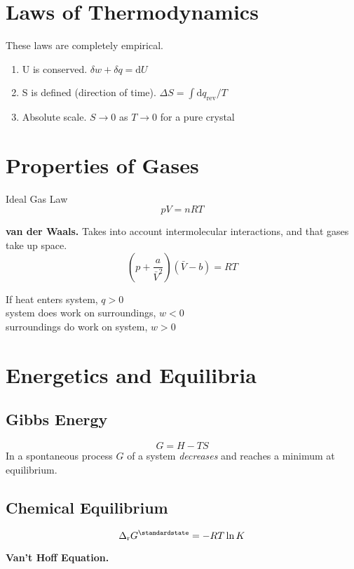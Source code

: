 \section{Laws of Thermodynamics}
These laws are completely empirical.

\begin{enumerate}
    \item U is conserved. $\delta w + \delta q = \mathrm{d}U$
    \item S is defined (direction of time). $ \Delta S = \int \mathrm{d}q_{\mathrm{rev}} / T$
    \item Absolute scale. $S \rightarrow 0$ as $T \rightarrow 0$ for a pure crystal
\end{enumerate}

\section{Properties of Gases}
Ideal Gas Law $$pV = nRT$$

\textbf{van der Waals.} Takes into account intermolecular interactions, and that gases take up space.
$$\left(p + \frac{a}{\bar{V}^2}\right) \left(\bar{V} - b\right) = RT$$ 

If heat enters system, $q > 0$\\
system does work on surroundings, $w < 0$\\
surroundings do work on system, $w > 0$

\section{Energetics and Equilibria}

\subsection*{Gibbs Energy}
\begin{equation*}
    G = H - TS
\end{equation*}
In a spontaneous process $G$ of a system \textit{decreases} and reaches a minimum at equilibrium.

\subsection*{Chemical Equilibrium}
\begin{equation*}
    \Delta_{\mathrm{r}}G^\standardstate = -RT \ln K
\end{equation*}

\textbf{Van't Hoff Equation.}

